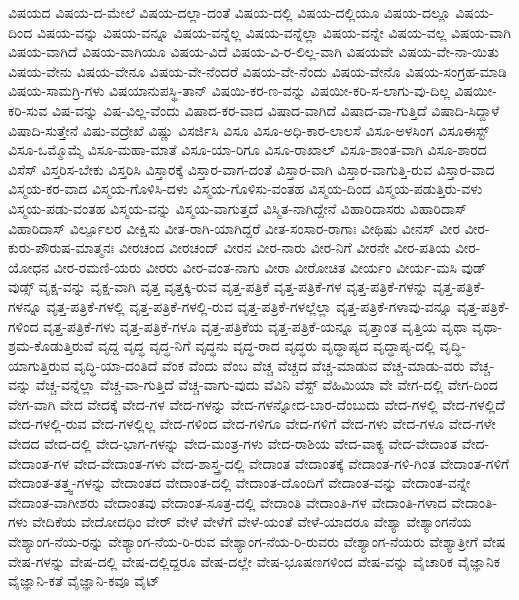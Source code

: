{ವಿಷಯದ
ವಿಷಯ-ದ-ಮೇಲೆ
ವಿಷಯ-ದಲ್ಲಾ-ದಂತೆ
ವಿಷಯ-ದಲ್ಲಿ
ವಿಷಯ-ದಲ್ಲಿಯೂ
ವಿಷಯ-ದಲ್ಲೂ
ವಿಷಯ-ದಿಂದ
ವಿಷಯ-ವನ್ನು
ವಿಷಯ-ವನ್ನೂ
ವಿಷಯ-ವನ್ನೆಲ್ಲ
ವಿಷಯ-ವನ್ನೆಲ್ಲಾ
ವಿಷಯ-ವನ್ನೇ
ವಿಷಯ-ವಲ್ಲ
ವಿಷಯ-ವಾಗಿ
ವಿಷಯ-ವಾಗಿದೆ
ವಿಷಯ-ವಾಗಿಯೂ
ವಿಷಯ-ವಿದೆ
ವಿಷಯ-ವಿ-ರ-ಲಿಲ್ಲ-ವಾಗಿ
ವಿಷಯವೇ
ವಿಷಯ-ವೇ-ನಾ-ಯಿತು
ವಿಷಯ-ವೇನು
ವಿಷಯ-ವೇನೂ
ವಿಷಯ-ವೇ-ನೆಂದರೆ
ವಿಷಯ-ವೇ-ನೆಂದು
ವಿಷಯ-ವೇನೊ
ವಿಷಯ-ಸಂಗ್ರಹ-ಮಾಡಿ
ವಿಷಯ-ಸಾಮಗ್ರಿ-ಗಳು
ವಿಷಯಾನುಪಸ್ಥಿ-ತಾನ್
ವಿಷಯಿ-ಕರ-ಣ-ವನ್ನು
ವಿಷಯೀ-ಕರಿ-ಸ-ಲಾಗು-ವು-ದಿಲ್ಲ
ವಿಷಯೀ-ಕರಿ-ಸುವ
ವಿಷ-ವನ್ನು
ವಿಷ-ವಿಲ್ಲ-ವೆಂದು
ವಿಷಾದ-ಕರ-ವಾದ
ವಿಷಾದ-ವಾಗಿದೆ
ವಿಷಾದ-ವಾ-ಗುತ್ತಿದೆ
ವಿಷಾದಿ-ಸಿದ್ದಾಳೆ
ವಿಷಾದಿ-ಸುತ್ತೇನೆ
ವಿಷು-ವದ್ರೇಖೆ
ವಿಷ್ಣು
ವಿಸರ್ಜಿಸಿ
ವಿಸೂ
ವಿಸೂ-ಅಧಿ-ಕಾರ-ಲಾಲಸೆ
ವಿಸೂ-ಅಳಸಿಂಗ
ವಿಸೂಈಸ್ಟ್
ವಿಸೂ-ಒಮ್ಮೊಮ್ಮೆ
ವಿಸೂ-ಮಹಾ-ಮಾತೆ
ವಿಸೂ-ಯಾ-ರಿಗೂ
ವಿಸೂ-ರಾಖಾಲ್
ವಿಸೂ-ಶಾಂತ-ವಾಗಿ
ವಿಸೂ-ಶಾರದ
ವಿಸೆಸ್
ವಿಸ್ತರಿಸ-ಬೇಕು
ವಿಸ್ತರಿಸಿ
ವಿಸ್ತಾರಕ್ಕೆ
ವಿಸ್ತಾರ-ವಾಗ-ದಂತೆ
ವಿಸ್ತಾರ-ವಾಗಿ
ವಿಸ್ತಾರ-ವಾಗುತ್ತಿ-ರುವ
ವಿಸ್ತಾರ-ವಾದ
ವಿಸ್ಮಯ-ಕರ-ವಾದ
ವಿಸ್ಮಯ-ಗೊಳಿಸಿ-ದಳು
ವಿಸ್ಮಯ-ಗೊಳಿಸು-ವಂತಹ
ವಿಸ್ಮಯ-ದಿಂದ
ವಿಸ್ಮಯ-ಪಡುತ್ತಿರು-ವಳು
ವಿಸ್ಮಯ-ಪಡು-ವಂತಹ
ವಿಸ್ಮಯ-ವನ್ನು
ವಿಸ್ಮಯ-ವಾಗುತ್ತದೆ
ವಿಸ್ಮಿತ-ನಾಗಿದ್ದೇನೆ
ವಿಹಾರಿದಾಸರು
ವಿಹಾರಿದಾಸ್
ವಿಹಾರಿದಾಸ್
ವಿರ್ಲ್ಪೂಲರ
ವೀಕ್ಷಿಸು
ವೀತ-ರಾಗಿ-ಯಾಗಿದ್ದರೆ
ವೀತ-ಸಂಸಾರ-ರಾಗಾಃ
ವೀಥಿಷು
ವೀನಸ್
ವೀರ
ವೀರ-ಕುರು-ಪೌರುಷ-ಮಾತ್ಮನಃ
ವೀರಚಂದ
ವೀರಚಂದ್
ವೀರನ
ವೀರ-ನಾರು
ವೀರ-ನಿಗೆ
ವೀರನೇ
ವೀರ-ಪತಿಯ
ವೀರ-ಯೋಧನ
ವೀರ-ರಮಣಿ-ಯರು
ವೀರರು
ವೀರ-ವಂತ-ನಾಗು
ವೀರಾ
ವೀರೋಚಿತ
ವೀರ್ಯಂ
ವೀರ್ಯ-ಮಸಿ
ವುಡ್
ವುಡ್ಸ್
ವೃಕ್ಷ-ವನ್ನು
ವೃಕ್ಷ-ವಾಗಿ
ವೃತ್ತ
ವೃತ್ತಕ್ಕಿ-ರುವ
ವೃತ್ತ-ಪತ್ರಿಕೆ
ವೃತ್ತ-ಪತ್ರಿಕೆ-ಗಳ
ವೃತ್ತ-ಪತ್ರಿಕೆ-ಗಳನ್ನು
ವೃತ್ತ-ಪತ್ರಿಕೆ-ಗಳನ್ನೂ
ವೃತ್ತ-ಪತ್ರಿಕೆ-ಗಳಲ್ಲಿ
ವೃತ್ತ-ಪತ್ರಿಕೆ-ಗಳಲ್ಲಿ-ರುವ
ವೃತ್ತ-ಪತ್ರಿಕೆ-ಗಳಲ್ಲೆಲ್ಲಾ
ವೃತ್ತ-ಪತ್ರಿಕೆ-ಗಳಾವು-ವನ್ನೂ
ವೃತ್ತ-ಪತ್ರಿಕೆ-ಗಳಿಂದ
ವೃತ್ತ-ಪತ್ರಿಕೆ-ಗಳು
ವೃತ್ತ-ಪತ್ರಿಕೆ-ಗಳೂ
ವೃತ್ತ-ಪತ್ರಿಕೆಯ
ವೃತ್ತ-ಪತ್ರಿಕೆ-ಯನ್ನೂ
ವೃತ್ತಾಂತ
ವೃತ್ತಿಯ
ವೃಥಾ
ವೃಥಾ-ಶ್ರಮ-ಕೊಡುತ್ತಿರುವೆ
ವೃದ್ದ
ವೃದ್ಧ
ವೃದ್ಧ-ನಿಗೆ
ವೃದ್ಧನು
ವೃದ್ಧ-ರಾದ
ವೃದ್ಧರು
ವೃದ್ಧಾಪ್ಯದ
ವೃದ್ಧಾಪ್ಯ-ದಲ್ಲಿ
ವೃದ್ಧಿ-ಯಾಗುತ್ತಿರುವ
ವೃದ್ಧಿ-ಯಾ-ದಂತಿದೆ
ವೆಂಕ
ವೆಂದು
ವೆಂಬ
ವೆಚ್ಚ
ವೆಚ್ಚದ
ವೆಚ್ಚ-ಮಾಡುವ
ವೆಚ್ಚ-ಮಾಡು-ವರು
ವೆಚ್ಚ-ವನ್ನು
ವೆಚ್ಚ-ವನ್ನೆಲ್ಲಾ
ವೆಚ್ಚ-ವಾ-ಗುತ್ತಿದೆ
ವೆಚ್ಚ-ವಾಗು-ವುದು
ವೆವಿನಿ
ವೆಸ್ಟ್
ವೆಹಿಮಿಯಾ
ವೇ
ವೇಗ-ದಲ್ಲಿ
ವೇಗ-ದಿಂದ
ವೇಗ-ವಾಗಿ
ವೇದ
ವೇದಕ್ಕೆ
ವೇದ-ಗಳ
ವೇದ-ಗಳನ್ನು
ವೇದ-ಗಳನ್ನೋದ-ಬಾರ-ದೆಂಬುದು
ವೇದ-ಗಳಲ್ಲಿ
ವೇದ-ಗಳಲ್ಲಿದೆ
ವೇದ-ಗಳಲ್ಲಿ-ರುವ
ವೇದ-ಗಳಲ್ಲಿಲ್ಲ
ವೇದ-ಗಳಿಂದ
ವೇದ-ಗಳಿಗೂ
ವೇದ-ಗಳಿಗೆ
ವೇದ-ಗಳು
ವೇದ-ಗಳೂ
ವೇದ-ಗಳೇ
ವೇದದ
ವೇದ-ದಲ್ಲಿ
ವೇದ-ಭಾಗ-ಗಳನ್ನು
ವೇದ-ಮಂತ್ರ-ಗಳು
ವೇದ-ರಾಶಿಯ
ವೇದ-ವಾಕ್ಯ
ವೇದ-ವೇದಾಂತ
ವೇದ-ವೇದಾಂತ-ಗಳ
ವೇದ-ವೇದಾಂತ-ಗಳು
ವೇದ-ಶಾಸ್ತ್ರ-ದಲ್ಲಿ
ವೇದಾಂತ
ವೇದಾಂತಕ್ಕೆ
ವೇದಾಂತ-ಗಳಿ-ಗಿಂತ
ವೇದಾಂತ-ಗಳಿಗೆ
ವೇದಾಂತ-ತತ್ತ್ವ-ಗಳನ್ನು
ವೇದಾಂತದ
ವೇದಾಂತ-ದಲ್ಲಿ
ವೇದಾಂತ-ದೊಂದಿಗೆ
ವೇದಾಂತ-ವನ್ನು
ವೇದಾಂತ-ವನ್ನೇ
ವೇದಾಂತ-ವಾಗೀಶರು
ವೇದಾಂತವು
ವೇದಾಂತ-ಸೂತ್ರ-ದಲ್ಲಿ
ವೇದಾಂತಿ
ವೇದಾಂತಿ-ಗಳ
ವೇದಾಂತಿ-ಗಳಾದ
ವೇದಾಂತಿ-ಗಳು
ವೇದಿಕೆಯ
ವೇದೋದಧಿಂ
ವೇರ್
ವೇಳೆ
ವೇಳೆಗೆ
ವೇಳೆ-ಯಂತೆ
ವೇಳೆ-ಯಾದರೂ
ವೇಶ್ಯಾ
ವೇಶ್ಯಾಂಗನೆಯ
ವೇಶ್ಯಾಂಗ-ನೆಯ-ರನ್ನು
ವೇಶ್ಯಾಂಗ-ನೆಯ-ರಿ-ರುವ
ವೇಶ್ಯಾಂಗ-ನೆಯ-ರಿ-ರುವರು
ವೇಶ್ಯಾಂಗ-ನೆಯರು
ವೇಶ್ಯಾತ್ರೀಗೆ
ವೇಷ
ವೇಷ-ಗಳನ್ನು
ವೇಷ-ದಲ್ಲಿ
ವೇಷ-ದಲ್ಲಿದ್ದರೂ
ವೇಷ-ದಲ್ಲೇ
ವೇಷ-ಭೂಷಣಗಳಿಂದ
ವೇಷ-ವನ್ನು
ವೈಚಾರಿಕ
ವೈಜ್ಞಾನಿಕ
ವೈಜ್ಞಾನಿ-ಕತೆ
ವೈಜ್ಞಾನಿ-ಕವೂ
ವೈಟ್
}
